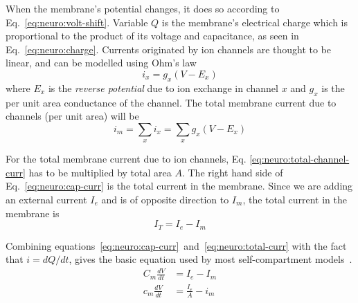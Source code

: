When the membrane's potential changes, it does so according to Eq.~\ref{eq:neuro:volt-shift}. Variable $Q$ is the membrane's electrical charge which is proportional to the product of its voltage and capacitance, as seen in Eq.~\ref{eq:neuro:charge}.
Currents originated by ion channels are thought to be linear, and can be modelled using Ohm's law
\begin{equation}
i_{x} = g_{x}(V - E_{x}) 
\label{eq:neuro:single-channel-curr}
\end{equation}
where $E_{x}$ is the \emph{reverse potential} due to ion exchange in channel $x$ and $g_{x}$ is the per unit area conductance of the channel. The total membrane current due to channels (per unit area) will be 
\begin{equation}
i_{m} = \sum_{x} i_{x} = \sum_{x} g_{x}(V - E_{x}) \label{eq:neuro:total-channel-curr}
\end{equation}

For the total membrane current due to ion channels, Eq. \ref{eq:neuro:total-channel-curr} has to be multiplied by total area $A$.
The right hand side of Eq.~\ref{eq:neuro:cap-curr} is the total current in the membrane. Since we are adding an external current $I_{e}$ and is of opposite direction to $I_{m}$, the total current in the membrane is
\begin{equation}
I_{T} = I_{e} - I_{m} 
\label{eq:neuro:total-curr}
\end{equation}

Combining equations~\ref{eq:neuro:cap-curr}~and~\ref{eq:neuro:total-curr} with the fact that $i=dQ/dt$, gives the basic equation used by most self-compartment models~\cite{dayan2001theoretical}.
\begin{align}
C_{m} \frac{dV}{dt} &= I_{e} - I_{m} 
\label{eq:neuro:basic-self-compartment} \\[0.5em]
c_{m} \frac{dV}{dt} &= \frac{I_{e}}{A} - i_{m}
\label{eq:neuro:basic-pu-self-compartment}
\end{align}


